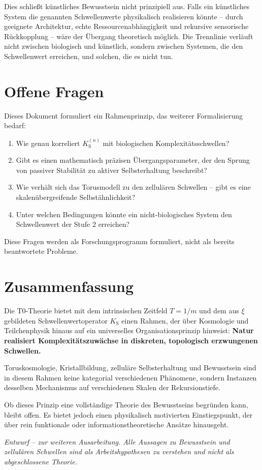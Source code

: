 	Dies schließt künstliches Bewusstsein nicht prinzipiell aus. Falls ein künstliches System die genannten Schwellenwerte physikalisch realisieren könnte -- durch geeignete Architektur, echte Ressourcenabhängigkeit und rekursive sensorische Rückkopplung -- wäre der Übergang theoretisch möglich. Die Trennlinie verläuft nicht zwischen biologisch und künstlich, sondern zwischen Systemen, die den Schwellenwert erreichen, und solchen, die es nicht tun.
	
	\section{Offene Fragen}
	
	Dieses Dokument formuliert ein Rahmenprinzip, das weiterer Formalisierung bedarf:
	\begin{enumerate}
		\item Wie genau korreliert $K_{\text{S}}^{(n)}$ mit biologischen Komplexitätsschwellen?
		\item Gibt es einen mathematisch präzisen Übergangsparameter, der den Sprung von passiver Stabilität zu aktiver Selbsterhaltung beschreibt?
		\item Wie verhält sich das Torusmodell zu den zellulären Schwellen -- gibt es eine skalenübergreifende Selbstähnlichkeit?
		\item Unter welchen Bedingungen könnte ein nicht-biologisches System den Schwellenwert der Stufe 2 erreichen?
	\end{enumerate}
	
	Diese Fragen werden als Forschungsprogramm formuliert, nicht als bereits beantwortete Probleme.
	
	\section{Zusammenfassung}
	
	Die T0-Theorie bietet mit dem intrinsischen Zeitfeld $T = 1/m$ und dem aus $\xi$ gebildeten Schwellenwertoperator $K_{\text{S}}$ einen Rahmen, der über Kosmologie und Teilchenphysik hinaus auf ein universelles Organisationsprinzip hinweist: \textbf{Natur realisiert Komplexitätszuwächse in diskreten, topologisch erzwungenen Schwellen.}
	
	Toruskosmologie, Kristallbildung, zelluläre Selbsterhaltung und Bewusstsein sind in diesem Rahmen keine kategorial verschiedenen Phänomene, sondern Instanzen desselben Mechanismus auf verschiedenen Skalen der Rekursionstiefe.
	
	Ob dieses Prinzip eine vollständige Theorie des Bewusstseins begründen kann, bleibt offen. Es bietet jedoch einen physikalisch motivierten Einstiegspunkt, der über rein funktionale oder informationstheoretische Ansätze hinausgeht.
	
	\vspace{1cm}
	\noindent
	\textit{Entwurf -- zur weiteren Ausarbeitung. Alle Aussagen zu Bewusstsein und zellulären Schwellen sind als Arbeitshypothesen zu verstehen und nicht als abgeschlossene Theorie.}
